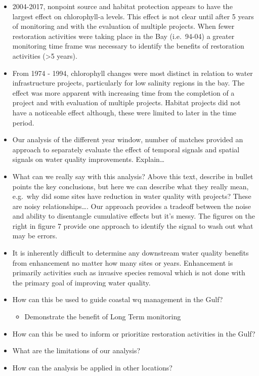 \documentclass[]{article}
\providecommand{\tightlist}{%
  \setlength{\itemsep}{0pt}\setlength{\parskip}{0pt}}
\begin{document}
\begin{itemize}
\item
  2004-2017, nonpoint source and habitat protection appears to have the
  largest effect on chlorophyll-a levels. This effect is not clear until
  after 5 years of monitoring and with the evaluation of multiple
  projects. When fewer restoration activities were taking place in the
  Bay (i.e.~94-04) a greater monitoring time frame was necessary to
  identify the benefits of restoration activities (\textgreater{}5
  years).
\item
  From 1974 - 1994, chlorophyll changes were most distinct in relation
  to water infrastructure projects, particularly for low salinity
  regions in the bay. The effect was more apparent with increasing time
  from the completion of a project and with evaluation of multiple
  projects. Habitat projects did not have a noticeable effect although,
  these were limited to later in the time period.
\item
  Our analysis of the different year window, number of matches provided
  an approach to separately evaluate the effect of temporal signals and
  spatial signals on water quality improvements. Explain\ldots{}
\item
  What can we really say with this analysis? Above this text, describe
  in bullet points the key conclusions, but here we can describe what
  they really mean, e.g.~why did some sites have reduction in water
  quality with projects? These are noisy relationships\ldots{}. Our
  approach provides a tradeoff between the noise and ability to
  disentangle cumulative effects but it's messy. The figures on the
  right in figure 7 provide one approach to identify the signal to wash
  out what may be errors.
\item
  It is inherently difficult to determine any downstream water quality
  benefits from enhancement no matter how many sites or years.
  Enhancement is primarily activities such as invasive species removal
  which is not done with the primary goal of improving water quality.
\item
  How can this be used to guide coastal wq management in the Gulf?

  \begin{itemize}
  \tightlist
  \item
    Demonstrate the benefit of Long Term monitoring
  \end{itemize}
\item
  How can this be used to inform or prioritize restoration activities in
  the Gulf?
\item
  What are the limitations of our analysis?
\item
  How can the analysis be applied in other locations?
\end{itemize}
\end{document}
